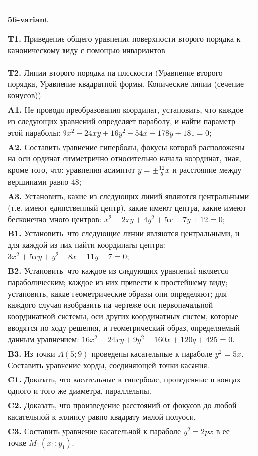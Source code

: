 \documentclass{article}
\begin{document}
\begin{tabular}{m{17cm}}
\textbf{56-variant}
\newline

\textbf{T1.} Приведение общего уравнения поверхности второго порядка к каноническому виду с помощью инвариантов \\
\textbf{T2.} Линии второго порядка на плоскости (Уравнение второго порядка, Уравнение квадратной формы, Конические линии (сечение конусов)) \\
\textbf{A1.} Не проводя преобразования координат, установить, что каждое из следующих уравнений определяет параболу, и найти параметр этой параболы: $9 x^2-24 x y+16 y^2-54 x-178 y+181=0$; \\
\textbf{A2.} Составить уравнение гиперболы, фокусы которой расположены на оси ординат симметрично относительно начала координат, зная, кроме того, что: уравнения асимптот $y= \pm \frac{12}{5} x$ и расстояние между вершинами равно 48; \\
\textbf{A3.} Установить, какие из следующих линий являются центральными (т.е. имеют единственный центр), какие имеют центра, какие имеют бесконечно много центров: $x^2-2 x y+4 y^2+5 x-7 y+12=0$; \\
\textbf{B1.} Установить, что следующие линии являются центральными, и для каждой из них найти координаты центра: $3 x^2+5 x y+y^2-8 x-11 y-7=0$; \\
\textbf{B2.} Установить, что каждое из следующих уравнений является параболическим; каждое из них привести к простейшему виду; установить, какие геометрические образы они определяют; для каждого случая изобразить на чертеже оси первоначальной координатной системы, оси других координатных систем, которые вводятся по ходу решения, и геометрический образ, определяемый данным уравнением: $16 x^2-24 x y+9 y^2-160 x+120 y+425=0$. \\
\textbf{B3.} Из точки $A(5 ; 9)$ проведены касательные к параболе $y^2=5 x$. Составить уравнение хорды, соединяющей точки касания. \\
\textbf{C1.} Доказать, что касательные к гиперболе, проведенные в концах одного и того же диаметра, параллельны. \\
\textbf{C2.} Доказать, что произведение расстояний от фокусов до любой касательной к эллипсу равно квадрату малой полуоси. \\
\textbf{C3.} Составить уравнение касагельной к параболе $y^2=2 p x$ в ее точке $M_1\left(x_1 ; y_1\right)$. \\

\end{tabular}
\vspace{1cm}
\end{document}

